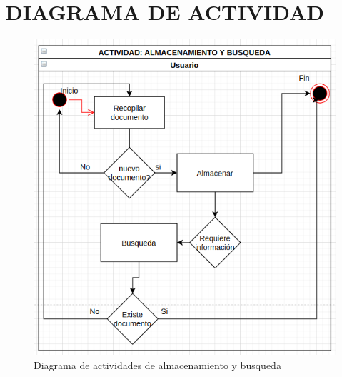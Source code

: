 \chapter*{DIAGRAMA DE ACTIVIDAD}

\begin{figure}[ht]
	\centering
	\includegraphics[scale=0.5]{images/actividad1}
	\caption{Diagrama de actividades de almacenamiento y busqueda}
\end{figure}